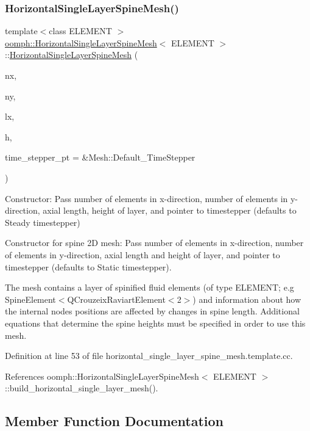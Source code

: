 \subsubsection{\texorpdfstring{Horizontal\+Single\+Layer\+Spine\+Mesh()}{HorizontalSingleLayerSpineMesh()}}
{\footnotesize\ttfamily template$<$class E\+L\+E\+M\+E\+NT $>$ \\
\hyperlink{classoomph_1_1HorizontalSingleLayerSpineMesh}{oomph\+::\+Horizontal\+Single\+Layer\+Spine\+Mesh}$<$ E\+L\+E\+M\+E\+NT $>$\+::\hyperlink{classoomph_1_1HorizontalSingleLayerSpineMesh}{Horizontal\+Single\+Layer\+Spine\+Mesh} (\begin{DoxyParamCaption}\item[{const unsigned \&}]{nx,  }\item[{const unsigned \&}]{ny,  }\item[{const double \&}]{lx,  }\item[{const double \&}]{h,  }\item[{Time\+Stepper $\ast$}]{time\+\_\+stepper\+\_\+pt = {\ttfamily \&Mesh\+:\+:Default\+\_\+TimeStepper} }\end{DoxyParamCaption})}



Constructor\+: Pass number of elements in x-\/direction, number of elements in y-\/direction, axial length, height of layer, and pointer to timestepper (defaults to Steady timestepper) 

Constructor for spine 2D mesh\+: Pass number of elements in x-\/direction, number of elements in y-\/direction, axial length and height of layer, and pointer to timestepper (defaults to Static timestepper).

The mesh contains a layer of spinified fluid elements (of type E\+L\+E\+M\+E\+NT; e.\+g Spine\+Element$<$Q\+Crouzeix\+Raviart\+Element$<$2$>$) and information about how the internal nodes positions are affected by changes in spine length. Additional equations that determine the spine heights must be specified in order to use this mesh. 

Definition at line 53 of file horizontal\+\_\+single\+\_\+layer\+\_\+spine\+\_\+mesh.\+template.\+cc.



References oomph\+::\+Horizontal\+Single\+Layer\+Spine\+Mesh$<$ E\+L\+E\+M\+E\+N\+T $>$\+::build\+\_\+horizontal\+\_\+single\+\_\+layer\+\_\+mesh().



\subsection{Member Function Documentation}
\mbox{\label{classoomph_1_1HorizontalSingleLayerSpineMesh_a9bd06cd24d2c48c499bf149b1773b442}} 
